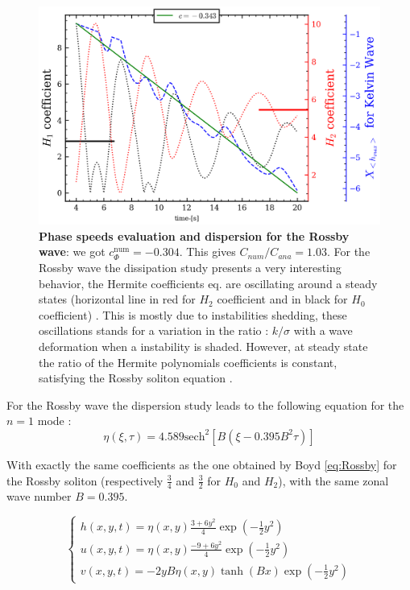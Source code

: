 \documentclass[11pt,a4paper]{report}
\begin{document}
\begin{multicols}{2}
\begin{figure}[H]
        \includegraphics[width=1\linewidth]{./figure/0velocity_wave_params_Rossby.png}
        \caption{\textbf{Phase speeds evaluation and dispersion for the Rossby wave}: we got $c_\Phi^{\text{num}} = -0.304 $. This gives $C_{num}/C_{ana} = 1.03$. For the Rossby wave the dissipation study presents a very interesting behavior, the Hermite coefficients  eq. are oscillating around a steady states (horizontal line in red for $H_2$ coefficient and in black for $H_0$ coefficient)
        . This is mostly due to instabilities shedding, these oscillations stands for a variation in the ratio : $k/\sigma$ with a wave deformation when a instability is shaded.
        However, at steady state the ratio of the Hermite polynomials coefficients is constant, satisfying the Rossby soliton equation .}
    \end{figure}
    For the Rossby wave the dispersion study leads to the following equation for the $n = 1$ mode :
    \begin{equation}
        \label{eq:num approx}
        \eta(\xi, \tau) = 4.589 \text{sech}^2[B(\xi - 0.395B^2\tau)]
    \end{equation}


    With exactly the same coefficients as the one obtained by Boyd \ref{eq:Rossby} for the Rossby soliton (respectively $\tfrac{3}{4}$ and $\tfrac{3}{2}$ for $H_0$ and $H_2$), with the same zonal wave number $B = 0.395$.

    \begin{equation}
        \label{eq:num approx}
        \begin{cases}
            h(x,y,t) = \eta(x,y) \frac{3 + 6y^2}{4}\exp(-\tfrac{1}{2}y^2)  \\
            u(x,y,t) = \eta(x,y) \frac{-9 + 6y^2}{4}\exp(-\tfrac{1}{2}y^2) \\
            v(x,y,t) = -2yB\eta(x,y) \tanh(Bx)\exp(-\tfrac{1}{2}y^2)
        \end{cases}
    \end{equation}


\end{multicols}
\end{document}
